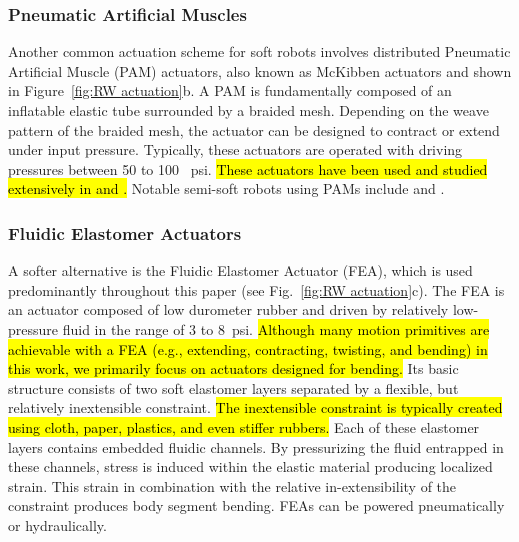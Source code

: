 \subsubsection{Pneumatic Artificial Muscles}
\label{subsubsec:RW PMA}
Another common actuation scheme for soft robots involves distributed Pneumatic Artificial Muscle (PAM) actuators, also known as McKibben actuators and shown in Figure~\ref{fig:RW actuation}b.
A PAM is fundamentally composed of an inflatable elastic tube surrounded by a braided mesh.
Depending on the weave pattern of the braided mesh, the actuator can be designed to contract or extend under input pressure.
Typically, these actuators are operated with driving pressures between 50 to 100 ~psi.
\hl{These actuators have been used and studied extensively in \mbox{\citet{chou1996measurement, tondu2000modeling}} \mbox{\citet{caldwell2000bio, daerden2002pneumatic}} and \mbox{\citet{reynolds2003modeling}}.}
Notable semi-soft robots using PAMs include \citet{mcmahan2006field, pritts2004design} and \citet{kang2013design}.

\subsubsection{Fluidic Elastomer Actuators}
\label{subsubsec:RW FEA}
A softer alternative is the Fluidic Elastomer Actuator (FEA), which is used predominantly throughout this paper (see Fig.~\ref{fig:RW actuation}c).
The FEA is an actuator composed of low durometer rubber and driven by relatively low-pressure fluid in the range of 3 to 8~psi.
\hl{Although many motion primitives are achievable with a FEA (e.g., extending, contracting, twisting, and bending) in this work, we primarily focus on actuators designed for bending.}
Its basic structure consists of two soft elastomer layers separated by a flexible, but relatively inextensible constraint.
\hl{The inextensible constraint is typically created using cloth, paper, plastics, and even stiffer rubbers.}
Each of these elastomer layers contains embedded fluidic channels.
By pressurizing the fluid entrapped in these channels, stress is induced within the elastic material producing localized strain. This strain in combination with the relative in-extensibility of the constraint produces body segment bending.
FEAs can be powered pneumatically or hydraulically.

